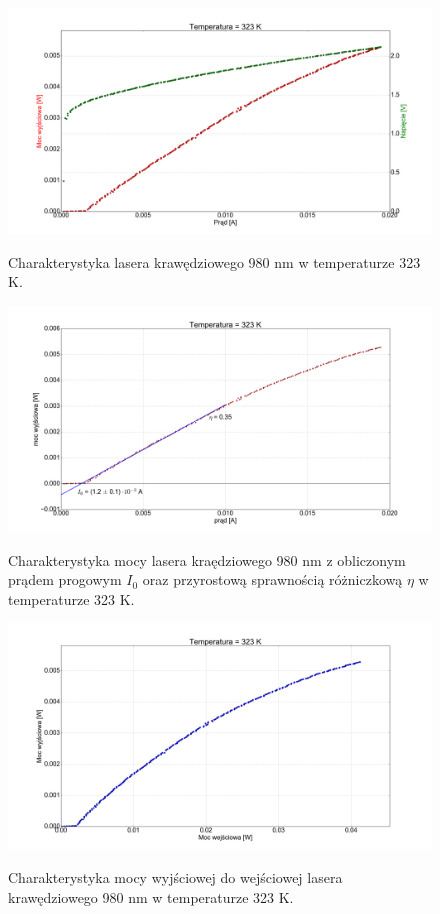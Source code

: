 \documentclass[a4paper, portrait,12pt]{report}
\begin{document}
\begin{figure}
\center
  \includegraphics[scale=0.30]{plot980/temp_50_IVL.png}
  \label{rys1}
  \caption{Charakterystyka lasera krawędziowego 980 nm w temperaturze 323 K.} 
\end{figure}

\begin{figure}
\center
  \includegraphics[scale=0.30]{plot980/temp_50_fit.png}
  \label{rys1}
  \caption{Charakterystyka mocy lasera kraędziowego 980 nm z obliczonym prądem progowym $I_0$ oraz przyrostową sprawnością różniczkową $\eta$ w temperaturze 323 K.} 
\end{figure}

\begin{figure}
\center
  \includegraphics[scale=0.30]{plot980/temp_50_power.png}
  \label{rys1}
  \caption{Charakterystyka mocy wyjściowej do wejściowej lasera krawędziowego 980 nm w temperaturze 323 K.}
\end{figure}
  
\end{document}
